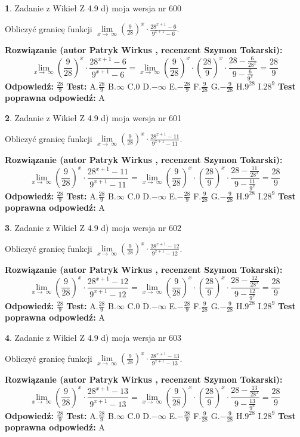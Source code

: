 \documentclass[12pt, a4paper]{article}
\theoremstyle{definition} %
\newtheorem{zad}{}
\newcommand{\zadStart}[1]{\begin{zad}#1\newline}
\newcommand{\zadStop}{\end{zad}}
\newcommand{\rozwStart}[2]{\noindent \textbf{Rozwiązanie (autor #1 , recenzent #2): }\newline}
\newcommand{\rozwStop}{\newline}
\newcommand{\odpStart}{\noindent \textbf{Odpowiedź:}\newline}
\newcommand{\odpStop}{\newline}
\newcommand{\testStart}{\noindent \textbf{Test:}\newline}
\newcommand{\testStop}{\newline}
\newcommand{\kluczStart}{\noindent \textbf{Test poprawna odpowiedź:}\newline}
\newcommand{\kluczStop}{\newline}
\begin{document}
\zadStart{Zadanie z Wikieł Z 4.9 d) moja wersja nr 600}


Obliczyć granicę funkcji  $\lim\limits_{x\to\ \infty}(\frac{9}{28})^{x}\cdot\frac{28^{x+1}-6}{9^{x+1}-6}$.
\zadStop
\rozwStart{Patryk Wirkus}{Szymon Tokarski}
$$\lim\limits_{x\to\ \infty}(\frac{9}{28})^{x}\cdot\frac{28^{x+1}-6}{9^{x+1}-6}=\lim\limits_{x\to\ \infty}(\frac{9}{28})^{x}\cdot(\frac{28}{9})^{x} \cdot \frac{28-\frac{6}{28^{x}}}{9-\frac{6}{9^{x}}} = \frac{28}{9}$$
\rozwStop
\odpStart
$\frac{28}{9}$
\odpStop
\testStart
A.$\frac{28}{9}$ B.$\infty$ C.$0$ D.$-\infty$ E.$-\frac{28}{9}$
F.$\frac{9}{28}$ G.$-\frac{9}{28}$
H.$9^{28}$
I.$28^{9}$
\testStop
\kluczStart
A
\kluczStop



\zadStart{Zadanie z Wikieł Z 4.9 d) moja wersja nr 601}


Obliczyć granicę funkcji  $\lim\limits_{x\to\ \infty}(\frac{9}{28})^{x}\cdot\frac{28^{x+1}-11}{9^{x+1}-11}$.
\zadStop
\rozwStart{Patryk Wirkus}{Szymon Tokarski}
$$\lim\limits_{x\to\ \infty}(\frac{9}{28})^{x}\cdot\frac{28^{x+1}-11}{9^{x+1}-11}=\lim\limits_{x\to\ \infty}(\frac{9}{28})^{x}\cdot(\frac{28}{9})^{x} \cdot \frac{28-\frac{11}{28^{x}}}{9-\frac{11}{9^{x}}} = \frac{28}{9}$$
\rozwStop
\odpStart
$\frac{28}{9}$
\odpStop
\testStart
A.$\frac{28}{9}$ B.$\infty$ C.$0$ D.$-\infty$ E.$-\frac{28}{9}$
F.$\frac{9}{28}$ G.$-\frac{9}{28}$
H.$9^{28}$
I.$28^{9}$
\testStop
\kluczStart
A
\kluczStop



\zadStart{Zadanie z Wikieł Z 4.9 d) moja wersja nr 602}


Obliczyć granicę funkcji  $\lim\limits_{x\to\ \infty}(\frac{9}{28})^{x}\cdot\frac{28^{x+1}-12}{9^{x+1}-12}$.
\zadStop
\rozwStart{Patryk Wirkus}{Szymon Tokarski}
$$\lim\limits_{x\to\ \infty}(\frac{9}{28})^{x}\cdot\frac{28^{x+1}-12}{9^{x+1}-12}=\lim\limits_{x\to\ \infty}(\frac{9}{28})^{x}\cdot(\frac{28}{9})^{x} \cdot \frac{28-\frac{12}{28^{x}}}{9-\frac{12}{9^{x}}} = \frac{28}{9}$$
\rozwStop
\odpStart
$\frac{28}{9}$
\odpStop
\testStart
A.$\frac{28}{9}$ B.$\infty$ C.$0$ D.$-\infty$ E.$-\frac{28}{9}$
F.$\frac{9}{28}$ G.$-\frac{9}{28}$
H.$9^{28}$
I.$28^{9}$
\testStop
\kluczStart
A
\kluczStop



\zadStart{Zadanie z Wikieł Z 4.9 d) moja wersja nr 603}


Obliczyć granicę funkcji  $\lim\limits_{x\to\ \infty}(\frac{9}{28})^{x}\cdot\frac{28^{x+1}-13}{9^{x+1}-13}$.
\zadStop
\rozwStart{Patryk Wirkus}{Szymon Tokarski}
$$\lim\limits_{x\to\ \infty}(\frac{9}{28})^{x}\cdot\frac{28^{x+1}-13}{9^{x+1}-13}=\lim\limits_{x\to\ \infty}(\frac{9}{28})^{x}\cdot(\frac{28}{9})^{x} \cdot \frac{28-\frac{13}{28^{x}}}{9-\frac{13}{9^{x}}} = \frac{28}{9}$$
\rozwStop
\odpStart
$\frac{28}{9}$
\odpStop
\testStart
A.$\frac{28}{9}$ B.$\infty$ C.$0$ D.$-\infty$ E.$-\frac{28}{9}$
F.$\frac{9}{28}$ G.$-\frac{9}{28}$
H.$9^{28}$
I.$28^{9}$
\testStop
\kluczStart
A
\kluczStop
\end{document}
